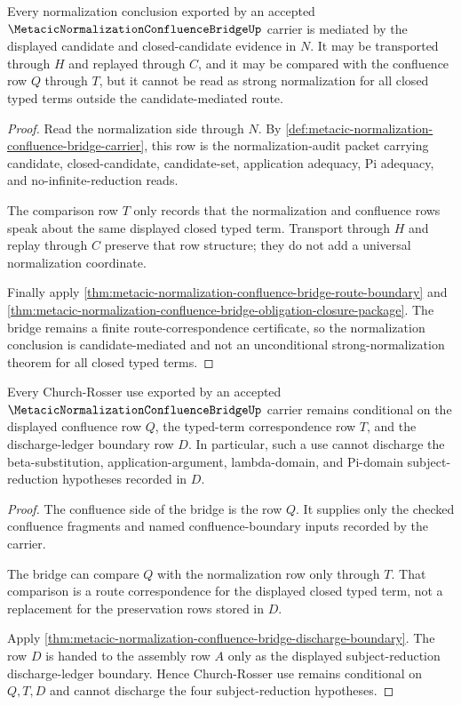 \begin{theorem}
\label{thm:metacic-normalization-confluence-bridge-candidate-mediated-normalization}
Every normalization conclusion exported by an accepted $\MetacicNormalizationConfluenceBridgeUp$ carrier is mediated by the displayed candidate and closed-candidate evidence in $N$. It may be transported through $H$ and replayed through $C$, and it may be compared with the confluence row $Q$ through $T$, but it cannot be read as strong normalization for all closed typed terms outside the candidate-mediated route.
\end{theorem}
\begin{proof}
Read the normalization side through $N$. By \autoref{def:metacic-normalization-confluence-bridge-carrier}, this row is the normalization-audit packet carrying candidate, closed-candidate, candidate-set, application adequacy, Pi adequacy, and no-infinite-reduction reads.

The comparison row $T$ only records that the normalization and confluence rows speak about the same displayed closed typed term. Transport through $H$ and replay through $C$ preserve that row structure; they do not add a universal normalization coordinate.

Finally apply \autoref{thm:metacic-normalization-confluence-bridge-route-boundary} and \autoref{thm:metacic-normalization-confluence-bridge-obligation-closure-package}. The bridge remains a finite route-correspondence certificate, so the normalization conclusion is candidate-mediated and not an unconditional strong-normalization theorem for all closed typed terms.
\end{proof}

\begin{theorem}
\label{thm:metacic-normalization-confluence-bridge-conditional-cr-boundary}
Every Church-Rosser use exported by an accepted $\MetacicNormalizationConfluenceBridgeUp$ carrier remains conditional on the displayed confluence row $Q$, the typed-term correspondence row $T$, and the discharge-ledger boundary row $D$. In particular, such a use cannot discharge the beta-substitution, application-argument, lambda-domain, and Pi-domain subject-reduction hypotheses recorded in $D$.
\end{theorem}
\begin{proof}
The confluence side of the bridge is the row $Q$. It supplies only the checked confluence fragments and named confluence-boundary inputs recorded by the carrier.

The bridge can compare $Q$ with the normalization row only through $T$. That comparison is a route correspondence for the displayed closed typed term, not a replacement for the preservation rows stored in $D$.

Apply \autoref{thm:metacic-normalization-confluence-bridge-discharge-boundary}. The row $D$ is handed to the assembly row $A$ only as the displayed subject-reduction discharge-ledger boundary. Hence Church-Rosser use remains conditional on $Q,T,D$ and cannot discharge the four subject-reduction hypotheses.
\end{proof}

